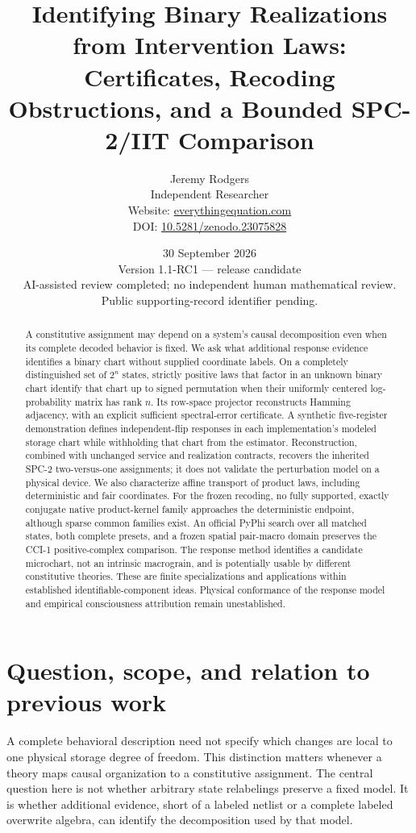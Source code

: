 \documentclass[11pt]{article}
\title{Identifying Binary Realizations from Intervention Laws: Certificates, Recoding Obstructions, and a Bounded SPC-2/IIT Comparison}
\author{Jeremy Rodgers\\\small Independent Researcher\\\small Website: \href{https://www.everythingequation.com}{everythingequation.com}\\\small DOI: \href{https://doi.org/10.5281/zenodo.23075828}{10.5281/zenodo.23075828}}
\date{30 September 2026\\\small Version 1.1-RC1 --- release candidate\\\footnotesize AI-assisted review completed; no independent human mathematical review.\\Public supporting-record identifier pending.}
\theoremstyle{definition}\newtheorem{definition}[theorem]{Definition}
\theoremstyle{remark}\newtheorem{remark}[theorem]{Remark}
\begin{document}
\maketitle
\begin{abstract}
A constitutive assignment may depend on a system's causal decomposition even when its complete decoded behavior is fixed. We ask what additional response evidence identifies a binary chart without supplied coordinate labels. On a completely distinguished set of $2^n$ states, strictly positive laws that factor in an unknown binary chart identify that chart up to signed permutation when their uniformly centered log-probability matrix has rank $n$. Its row-space projector reconstructs Hamming adjacency, with an explicit sufficient spectral-error certificate. A synthetic five-register demonstration defines independent-flip responses in each implementation's modeled storage chart while withholding that chart from the estimator. Reconstruction, combined with unchanged service and realization contracts, recovers the inherited SPC-2 two-versus-one assignments; it does not validate the perturbation model on a physical device. We also characterize affine transport of product laws, including deterministic and fair coordinates. For the frozen recoding, no fully supported, exactly conjugate native product-kernel family approaches the deterministic endpoint, although sparse common families exist. An official PyPhi search over all matched states, both complete presets, and a frozen spatial pair-macro domain preserves the CCI-1 positive-complex comparison. The response method identifies a candidate microchart, not an intrinsic macrograin, and is potentially usable by different constitutive theories. These are finite specializations and applications within established identifiable-component ideas. Physical conformance of the response model and empirical consciousness attribution remain unestablished.
\end{abstract}

\section{Question, scope, and relation to previous work}
A complete behavioral description need not specify which changes are local to one physical storage degree of freedom. This distinction matters whenever a theory maps causal organization to a constitutive assignment. The central question here is not whether arbitrary state relabelings preserve a fixed model. It is whether additional evidence, short of a labeled netlist or a complete labeled overwrite algebra, can identify the decomposition used by that model.
\end{document}
